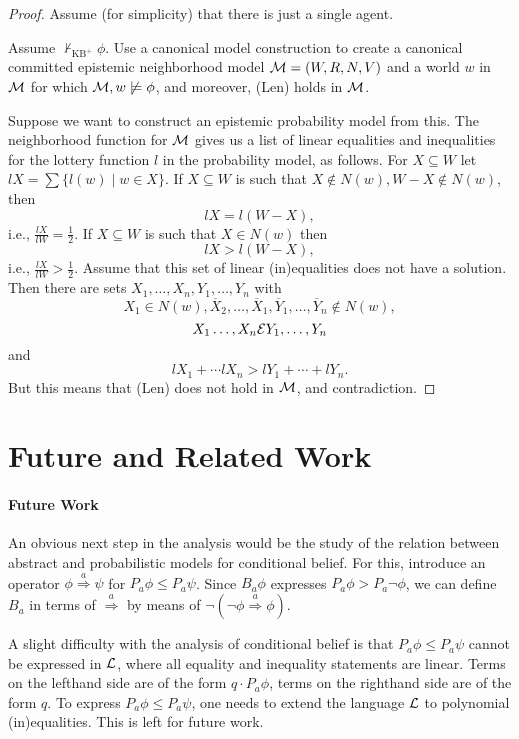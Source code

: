 \documentclass[12pt]{article}
\newcommand{\XXXcomment}[1]{}
\newcommand{\XXXcomment}[1]{\marginpar{\color{blue}{\footnotesize #1}}}
\theoremstyle{definition}
\newcommand{\M}{{\cal M}}      %
\newcommand{\Lang}{{\cal L}}   %
\newcommand{\Rel}[1]{\stackrel{#1}{\Longrightarrow}}         %
\begin{document}
\begin{proof}
Assume (for simplicity) that there is just a single agent.

Assume $\not\vdash_{\text{KB}^{+}} \phi$. Use a canonical model 
construction to create a canonical committed
  epistemic neighborhood model $\M = (W,R,N,V)$ and a world $w$ in $\M$ for
  which $\M, w \not\models \phi$, and moreover, (Len) holds in $\M$. 

Suppose we want to construct an epistemic probability model from this. 
The neighborhood function for $\M$ gives us a list of linear equalities 
and inequalities for the lottery function $l$ in the probability model, as follows. 
For $X \subseteq W$ let $lX = \sum \{ l(w) \mid w \in X \}$.
If $X \subseteq W$ is such that $X \notin N(w), W-X \notin N(w)$, then 
\[
  lX = l(W-X),
\]
i.e., $\frac{lX}{lW} = \frac 1 2$. 
If $X \subseteq W$ is such that $X \in N(w)$
then 
\[
  lX > l(W-X),
\]
i.e., $\frac{lX}{lW} > \frac 1 2$. 
Assume that this set of linear (in)equalities does not have a solution. 
Then there are sets $X_1, \ldots, X_n, Y_1, \ldots, Y_n$ with 
\[
 X_1 \in N(w), \overline{X}_2, \ldots,  \overline{X}_1, \overline{Y}_1, \ldots, 
\overline{Y}_n \notin N(w), 
\]
\[
X_1 \ldots, X_n {\cal E} Y_1, \ldots, Y_n
\]
and 
\[
lX_1 + \cdots lX_n > lY_1 + \cdots + lY_n. 
\]
But this means that (Len) does not hold in $\M$, and contradiction. 

\XXXcomment{Proof to be completed. First spell out the single agent case in more
detail, next tackle the multi-agent case \ldots} 
\end{proof}

\section{Future and Related Work} \label{SectionFRW} 

\paragraph{Future Work} 

An obvious next step in the analysis would be the study of the relation between 
abstract and probabilistic models for conditional belief. 
For this, introduce an operator $\phi \Rel{a} \psi$ for $P_a \phi \leq P_a\psi$. 
Since $B_a \phi$ expresses $P_a\phi > P_a \neg \phi$, we can 
define  $B_a$ in terms of $\Rel{a}$ by means of $\neg (\neg \phi \Rel{a} \phi)$. 

A slight difficulty with the analysis of conditional belief is that 
$P_a \phi \leq P_a\psi$ cannot be expressed in $\Lang$, where all equality and inequality 
statements are linear. Terms on the lefthand side are of the form 
$q \cdot P_a \phi$, terms on the righthand side are of the form $q$. 
To express  $P_a \phi \leq P_a\psi$, one needs to extend the language $\Lang$ to 
polynomial (in)equalities. This is left for future work. 
\end{document}
